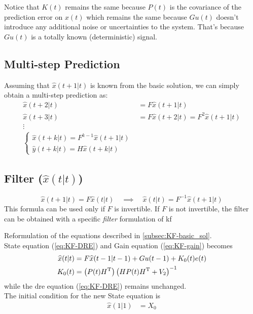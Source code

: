 Notice that $K(t)$ remains the same because $P(t)$ is the covariance of the prediction error on $x(t)$ which remains the same because $Gu(t)$ doesn't introduce any additional noise or uncertainties to the system.
That's because $Gu(t)$ is a totally known (deterministic) signal.

\subsection{Multi-step Prediction}

Assuming that $\hat{x}(t+1|t)$ is known from the basic solution, we can simply obtain a multi-step prediction as:
\begin{align*}
    \hat{x}(t+2|t) &= F \hat{x}(t+1|t) \\
    \hat{x}(t+3|t) &= F \hat{x}(t+2|t) = F^2\hat{x}(t+1|t) \\
    \vdots \\ 
    \begin{cases}
        \hat{x}(t+k|t) = F^{k-1} \hat{x}(t+1|t) \\
        \hat{y}(t+k|t) = H\hat{x}(t+k|t)
    \end{cases}
\end{align*}   


\subsection{Filter ($\hat{x}(t|t)$)}

\[
    \hat{x}(t+1|t) = F\hat{x}(t|t) \quad \implies \quad \hat{x}(t|t) = F^{-1}\hat{x}(t+1|t)
\]
This formula can be used only if $F$ is invertible.
If $F$ is not invertible, the filter can be obtained with a specific \emph{filter} formulation of \gls{kf}

\begin{definition} \label{KF-Filter_Form_sol}
    Reformulation of the equations described in \ref{subsec:KF-basic_sol}.\\
    State equation (\ref{eq:KF-DRE}) and Gain equation (\ref{eq:KF-gain}) becomes  
    \begin{align*}
        \widehat{x}(t|t) &= F\widehat{x}(t-1|t-1) + Gu(t-1) + K_0(t)e(t) \\
        K_0(t) &= \left(P(t)H^{\mathrm{T}}\right) \left(HP(t)H^{\mathrm{T}}+V_2\right)^{-1} \\
    \end{align*}
    while the \gls{dre} equation (\ref{eq:KF-DRE}) remains unchanged.\\
    
    The initial condition for the new State equation is 
    \begin{align*}
        \hat{x}(1|1) &= X_0 
    \end{align*}
\end{definition}

